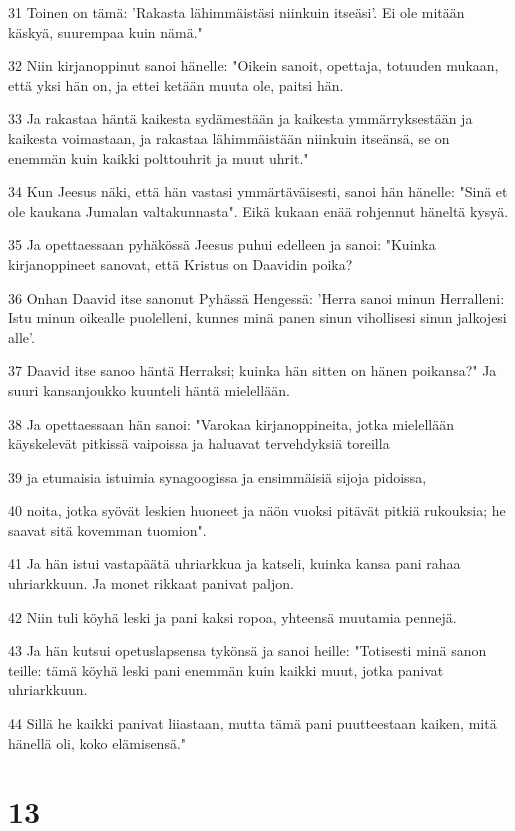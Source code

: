 \par 31 Toinen on tämä: 'Rakasta lähimmäistäsi niinkuin itseäsi'. Ei ole mitään käskyä, suurempaa kuin nämä."
\par 32 Niin kirjanoppinut sanoi hänelle: "Oikein sanoit, opettaja, totuuden mukaan, että yksi hän on, ja ettei ketään muuta ole, paitsi hän.
\par 33 Ja rakastaa häntä kaikesta sydämestään ja kaikesta ymmärryksestään ja kaikesta voimastaan, ja rakastaa lähimmäistään niinkuin itseänsä, se on enemmän kuin kaikki polttouhrit ja muut uhrit."
\par 34 Kun Jeesus näki, että hän vastasi ymmärtäväisesti, sanoi hän hänelle: "Sinä et ole kaukana Jumalan valtakunnasta". Eikä kukaan enää rohjennut häneltä kysyä.
\par 35 Ja opettaessaan pyhäkössä Jeesus puhui edelleen ja sanoi: "Kuinka kirjanoppineet sanovat, että Kristus on Daavidin poika?
\par 36 Onhan Daavid itse sanonut Pyhässä Hengessä: 'Herra sanoi minun Herralleni: Istu minun oikealle puolelleni, kunnes minä panen sinun vihollisesi sinun jalkojesi alle'.
\par 37 Daavid itse sanoo häntä Herraksi; kuinka hän sitten on hänen poikansa?" Ja suuri kansanjoukko kuunteli häntä mielellään.
\par 38 Ja opettaessaan hän sanoi: "Varokaa kirjanoppineita, jotka mielellään käyskelevät pitkissä vaipoissa ja haluavat tervehdyksiä toreilla
\par 39 ja etumaisia istuimia synagoogissa ja ensimmäisiä sijoja pidoissa,
\par 40 noita, jotka syövät leskien huoneet ja näön vuoksi pitävät pitkiä rukouksia; he saavat sitä kovemman tuomion".
\par 41 Ja hän istui vastapäätä uhriarkkua ja katseli, kuinka kansa pani rahaa uhriarkkuun. Ja monet rikkaat panivat paljon.
\par 42 Niin tuli köyhä leski ja pani kaksi ropoa, yhteensä muutamia pennejä.
\par 43 Ja hän kutsui opetuslapsensa tykönsä ja sanoi heille: "Totisesti minä sanon teille: tämä köyhä leski pani enemmän kuin kaikki muut, jotka panivat uhriarkkuun.
\par 44 Sillä he kaikki panivat liiastaan, mutta tämä pani puutteestaan kaiken, mitä hänellä oli, koko elämisensä."

\chapter{13}

